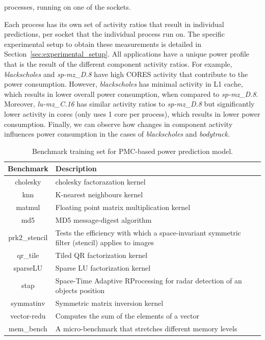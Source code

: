 processes, running on one of the sockets.  
\par
Each process has its own set of activity ratios that result in individual predictions, per
socket that the individual process run on.  The specific experimental setup to obtain
these measurements is detailed in Section~\ref{sec:experimental_setup}.  All applications
have a unique power profile that is the result of the different component activity ratios.
For example, \textit{blackscholes} and \textit{sp-mz\_D.8} have high CORES activity
that contribute to the power consumption.  However, \textit{blackscholes} has minimal
activity in L1 cache, which results in lower overall power consumption, when compared to
\textit{sp-mz\_D.8}.  Moreover, \textit{lu-mz\_C.16} has similar activity ratios to
\textit{sp-mz\_D.8} but significantly lower activity in cores (only uses 1 core per
process), which results in lower power consumption.  Finally, we can observe how changes
in component activity influences power consumption in the cases of \textit{blackscholes}
and \textit{bodytrack}.

\begin{table}
        \centering
        \caption{Benchmark training set for PMC-based power prediction model.}
        \label{tab:training_set}
        \begin{tabular}{ | c | m{10cm} | }
                \hline
                \textbf{Benchmark} & \textbf{Description} \\
                \hline
                \hline
                cholesky & cholesky factorazation kernel \\
                \hline
                knn & K-nearest neighbours kernel \\
                \hline
                matmul & Floating point matrix multiplication kernel \\
                \hline
                md5 & MD5 message-digest algorithm \\
                \hline
                prk2\_stencil & Tests the efficiency with which a space-invariant symmetric filter (stencil) applies to images \\
                \hline
                qr\_tile & Tiled QR factorization kernel \\
                \hline
                sparseLU & Sparse LU factorization kernel\\
                \hline
                stap & Space-Time Adaptive RProcessing for radar detection of an objects position \\
                \hline
                symmatinv & Symmetric matrix inversion kernel \\
                \hline
                vector-redu & Computes the sum of the elements of a vector \\
                \hline
                mem\_bench & A micro-benchmark that stretches different memory levels \\
                \hline
        \end{tabular}
\end{table}

